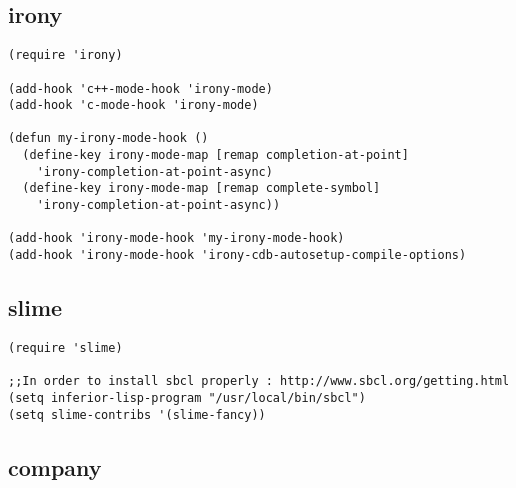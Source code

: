 \documentclass[11pt]{article}
\begin{document}
\subsection{irony}
\label{sec-2-19}
\begin{verbatim}
(require 'irony)

(add-hook 'c++-mode-hook 'irony-mode)
(add-hook 'c-mode-hook 'irony-mode)

(defun my-irony-mode-hook ()
  (define-key irony-mode-map [remap completion-at-point]
    'irony-completion-at-point-async)
  (define-key irony-mode-map [remap complete-symbol]
    'irony-completion-at-point-async))

(add-hook 'irony-mode-hook 'my-irony-mode-hook)
(add-hook 'irony-mode-hook 'irony-cdb-autosetup-compile-options)
\end{verbatim}
\subsection{slime}
\label{sec-2-20}
\begin{verbatim}
(require 'slime)

;;In order to install sbcl properly : http://www.sbcl.org/getting.html
(setq inferior-lisp-program "/usr/local/bin/sbcl")
(setq slime-contribs '(slime-fancy))
\end{verbatim}
\subsection{company}
\label{sec-2-21}
\end{document}

